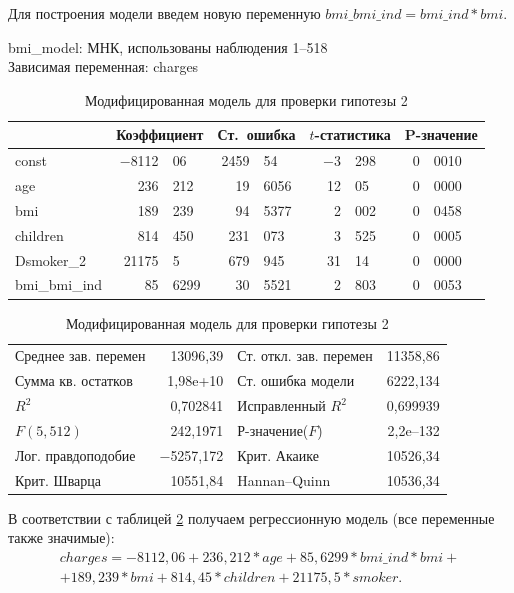 \documentclass[a4paper,12pt]{article}
\begin{document}
Для построения модели введем новую переменную $bmi\_bmi\_ind = bmi\_ind * bmi$.

\begin{table}[H]
	\begin{center}
		bmi\_model:
		МНК, использованы наблюдения 1--518\\
		Зависимая переменная: charges\\
		\vspace{1em}
		\begin{tabular}{|l|r@{,}l|r@{,}l|r@{,}l|r@{,}l|}
			\hline
			&
			\multicolumn{2}{c|}{Коэффициент} &
			\multicolumn{2}{c|}{Ст.\ ошибка} &
			\multicolumn{2}{c|}{$t$-статистика} &
			\multicolumn{2}{c|}{P-значение} \\[1ex]
			\hline
			const & $-$8112&06 & 2459&54 & $-$3&298 & 0&0010 \\
			\hline
			age & 236&212 &	19&6056 & 12&05 & 0&0000 \\
			\hline
			bmi & 189&239 & 94&5377 & 2&002 & 0&0458 \\
			\hline
			children & 814&450 & 231&073 & 3&525 & 0&0005 \\
			\hline
			Dsmoker\_2 & 21175&5 & 679&945 & 31&14 & 0&0000 \\
			\hline
			bmi\_bmi\_ind & 85&6299 & 30&5521 &	2&803 &	0&0053 \\
			\hline
		\end{tabular}
		\vspace{1ex}
		\begin{tabular}{lrlr}
			Среднее зав. перемен &  13096,39 & Ст. откл. зав. перемен &  11358,86 \\
			Сумма кв. остатков &  1,98\textrm{e+10} & Ст. ошибка модели &  6222,134 \\
			$R^2$ &  0,702841 & Исправленный $R^2$ &  0,699939 \\
			$F(5, 512)$ &  242,1971 & Р-значение($F$) &  2,2\textrm{e--132} \\
			Лог. правдоподобие & $-$5257,172 & Крит. Акаике &  10526,34 \\
			Крит. Шварца &  10551,84 & Hannan--Quinn &  10536,34 \\
		\end{tabular}
	\end{center}
	\caption{Модифицированная модель для проверки гипотезы 2}
	\label{tab:bmi-model}
\end{table} 

В соответствии с таблицей \ref{tab:bmi-model} получаем регрессионную модель (все переменные также значимые):
\begin{align*}
charges = -8112,06 + 236,212 * age + 85,6299 * bmi\_ind * bmi + \\ + 189,239 * bmi + 814,45 * children + 21175,5 * smoker.
\end{align*}
\end{document}
